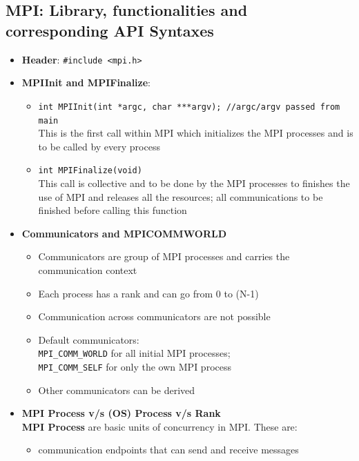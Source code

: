 \documentclass[12pt, a4paper]{report}
\begin{document}
\subsection{MPI: Library, functionalities and corresponding API Syntaxes}
\begin{itemize}
    \item {\bfseries{Header}}: \verb$#include <mpi.h>$
    \item {\bfseries{MPI\textunderscore Init and MPI\textunderscore Finalize}}:
    \begin{itemize}
        \item \texttt{int MPI\textunderscore Init(int *argc, char ***argv); //argc/argv passed from main}\\
        This is the first call within MPI which initializes the MPI processes and is to be called by every process
        \item \texttt{int MPI\textunderscore Finalize(void)}\\
        This call is collective and to be done by the MPI processes to finishes the use of MPI and releases all the resources; all communications to be finished before calling
        this function
    \end{itemize}
    \item {\bfseries{Communicators and MPI\textunderscore COMM\textunderscore WORLD}}
    \begin{itemize}
        \item Communicators are group of MPI processes and carries the communication context
        \item Each process has a rank and can go from 0 to (N-1)
        \item Communication across communicators are not possible
        \item Default communicators:\\
              \verb$MPI_COMM_WORLD$ for all initial MPI processes;\\
              \verb$MPI_COMM_SELF$ for only the own MPI process
        \item Other communicators can be derived
    \end{itemize}
    \item {\bfseries{MPI Process v/s (OS) Process v/s Rank}}\\
    {\bfseries{MPI Process}} are basic units of concurrency in MPI. These are: 
    \begin{itemize}
        \item communication endpoints that can send and receive messages

\end{itemize}
\end{itemize}
\end{document}
